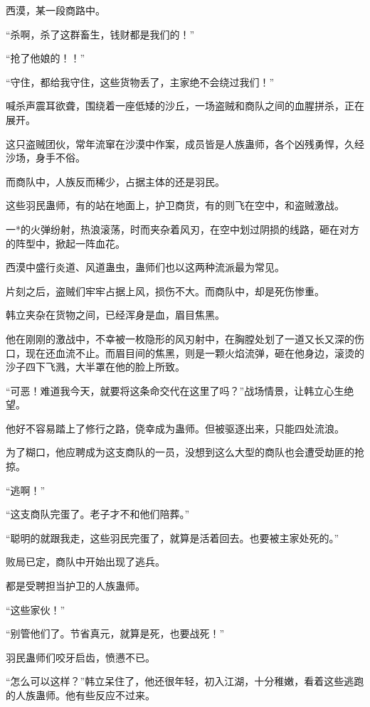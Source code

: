 
\begin{this_body}

西漠，某一段商路中。

“杀啊，杀了这群畜生，钱财都是我们的！”

“抢了他娘的！！”

“守住，都给我守住，这些货物丢了，主家绝不会绕过我们！”

喊杀声震耳欲聋，围绕着一座低矮的沙丘，一场盗贼和商队之间的血腥拼杀，正在展开。

这只盗贼团伙，常年流窜在沙漠中作案，成员皆是人族蛊师，各个凶残勇悍，久经沙场，身手不俗。

而商队中，人族反而稀少，占据主体的还是羽民。

这些羽民蛊师，有的站在地面上，护卫商货，有的则飞在空中，和盗贼激战。

一*的火弹纷射，热浪滚荡，时而夹杂着风刃，在空中划过阴损的线路，砸在对方的阵型中，掀起一阵血花。

西漠中盛行炎道、风道蛊虫，蛊师们也以这两种流派最为常见。

片刻之后，盗贼们牢牢占据上风，损伤不大。而商队中，却是死伤惨重。

韩立夹杂在货物之间，已经浑身是血，眉目焦黑。

他在刚刚的激战中，不幸被一枚隐形的风刃射中，在胸膛处划了一道又长又深的伤口，现在还血流不止。而眉目间的焦黑，则是一颗火焰流弹，砸在他身边，滚烫的沙子四下飞溅，大半罩在他的脸上所致。

“可恶！难道我今天，就要将这条命交代在这里了吗？”战场情景，让韩立心生绝望。

他好不容易踏上了修行之路，侥幸成为蛊师。但被驱逐出来，只能四处流浪。

为了糊口，他应聘成为这支商队的一员，没想到这么大型的商队也会遭受劫匪的抢掠。

“逃啊！”

“这支商队完蛋了。老子才不和他们陪葬。”

“聪明的就跟我走，这些羽民完蛋了，就算是活着回去。也要被主家处死的。”

败局已定，商队中开始出现了逃兵。

都是受聘担当护卫的人族蛊师。

“这些家伙！”

“别管他们了。节省真元，就算是死，也要战死！”

羽民蛊师们咬牙启齿，愤懑不已。

“怎么可以这样？”韩立呆住了，他还很年轻，初入江湖，十分稚嫩，看着这些逃跑的人族蛊师。他有些反应不过来。


\end{this_body}
